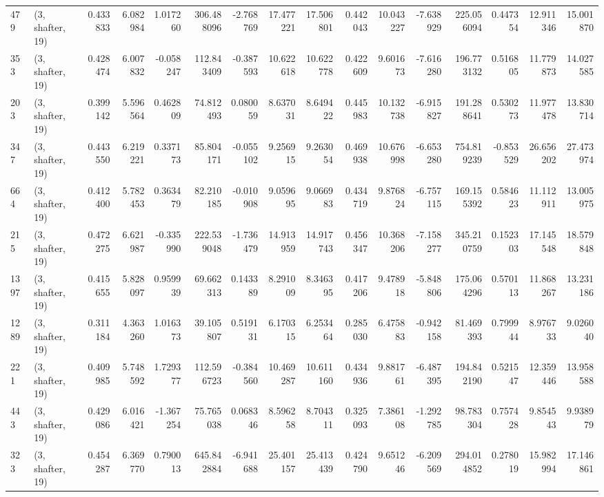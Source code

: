 \begin{tabular}{llrrrrrrrrrrrrrr}
479  &  (3, shafter, 19) &   0.433833 &   6.082984 &   1.017260 &    306.488096 &   -2.768769 &   17.477221 &   17.506801 &  0.442043 &  10.043227 &  -7.638929 &   225.056094 &   0.447354 &  12.911346 &  15.001870 \\
353  &  (3, shafter, 19) &   0.428474 &   6.007832 &  -0.058247 &    112.843409 &   -0.387593 &   10.622618 &   10.622778 &  0.422609 &   9.601673 &  -7.616280 &   196.773132 &   0.516805 &  11.779873 &  14.027585 \\
203  &  (3, shafter, 19) &   0.399142 &   5.596564 &   0.462809 &     74.812493 &    0.080059 &    8.637031 &    8.649422 &  0.445983 &  10.132738 &  -6.915827 &   191.288641 &   0.530273 &  11.977478 &  13.830714 \\
347  &  (3, shafter, 19) &   0.443550 &   6.219221 &   0.337173 &     85.804171 &   -0.055102 &    9.256915 &    9.263054 &  0.469938 &  10.676998 &  -6.653280 &   754.819239 &  -0.853529 &  26.656202 &  27.473974 \\
664  &  (3, shafter, 19) &   0.412400 &   5.782453 &   0.363479 &     82.210185 &   -0.010908 &    9.059695 &    9.066983 &  0.434719 &   9.876824 &  -6.757115 &   169.155392 &   0.584623 &  11.112911 &  13.005975 \\
215  &  (3, shafter, 19) &   0.472275 &   6.621987 &  -0.335990 &    222.539048 &   -1.736479 &   14.913959 &   14.917743 &  0.456347 &  10.368206 &  -7.158277 &   345.210759 &   0.152303 &  17.145548 &  18.579848 \\
1397 &  (3, shafter, 19) &   0.415655 &   5.828097 &   0.959939 &     69.662313 &    0.143389 &    8.291009 &    8.346395 &  0.417206 &   9.478918 &  -5.848806 &   175.064296 &   0.570113 &  11.868267 &  13.231186 \\
1289 &  (3, shafter, 19) &   0.311184 &   4.363260 &   1.016373 &     39.105807 &    0.519131 &    6.170315 &    6.253464 &  0.285030 &   6.475883 &  -0.942158 &    81.469393 &   0.799944 &   8.976733 &   9.026040 \\
221  &  (3, shafter, 19) &   0.409985 &   5.748592 &   1.729377 &    112.596723 &   -0.384560 &   10.469287 &   10.611160 &  0.434936 &   9.881761 &  -6.487395 &   194.842190 &   0.521547 &  12.359446 &  13.958588 \\
443  &  (3, shafter, 19) &   0.429086 &   6.016421 &  -1.367254 &     75.765038 &    0.068346 &    8.596258 &    8.704311 &  0.325093 &   7.386108 &  -1.292785 &    98.783304 &   0.757428 &   9.854543 &   9.938979 \\
323  &  (3, shafter, 19) &   0.454287 &   6.369770 &   0.790013 &    645.842884 &   -6.941688 &   25.401157 &   25.413439 &  0.424790 &   9.651246 &  -6.209569 &   294.014852 &   0.278019 &  15.982994 &  17.146861 \\

\end{tabular}
